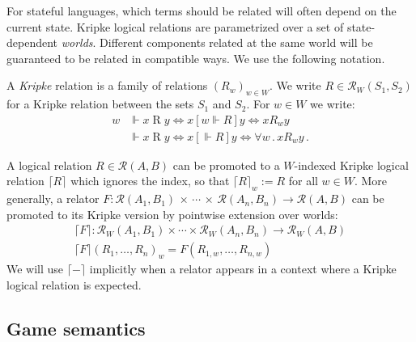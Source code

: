 \documentclass[sigplan,10pt,review,anonymous]{acmart}\settopmatter{printfolios=true,printccs=false,printacmref=false}
\newcommand{\ifr}[1]{\mathrel{[{#1}]}}
\begin{document}

For stateful languages,
which terms should be related
will often depend on the current state.
Kripke logical relations
are parametrized over a set of state-dependent \emph{worlds}.
Different components related at the same world
will be guaranteed to be related in compatible ways.
We use the following notation.

\begin{definition} \label{def:klr} %
A \emph{Kripke} relation is
a family of relations $(R_w)_{w \in W}$.
We write $R \in \mathcal{R}_W(S_1, S_2)$
for a Kripke relation between the sets $S_1$ and $S_2$.
For $w \in W$ we write:
\begin{align*}
    w &\Vdash x \mathrel{R} y \Leftrightarrow
      x \ifr{w \Vdash R} y \Leftrightarrow
      x \mathrel{R_w} y \\
    &\Vdash x \mathrel{R} y \Leftrightarrow
      x \ifr{\Vdash R} y \Leftrightarrow
      \forall w \,.\, x \mathrel{R_w} y \,.
\end{align*}
\end{definition}

A logical relation $R \in \mathcal{R}(A, B)$
can be promoted to a $W$-indexed Kripke logical relation $\lceil R \rceil$
which ignores the index, so that $\lceil R \rceil_w := R$ for all $w \in W$.
More generally,
a relator
  $F : \mathcal{R}(A_1, B_1) \,\times\,\cdots\,\times\,\mathcal{R}(A_n, B_n) \rightarrow \mathcal{R}(A, B)$
can be promoted to its Kripke version
by pointwise extension over worlds:
\begin{gather*}
  \lceil F \rceil : \mathcal{R}_W(A_1, B_1) \times \cdots \times \mathcal{R}_W(A_n, B_n) \rightarrow \mathcal{R}_W(A, B) \\
  \lceil F \rceil (R_1, \ldots, R_n)_w = F(R_{1,w}, \ldots, R_{n,w})
\end{gather*}
We will use $\lceil - \rceil$ implicitly
when a relator appears in a context where
a Kripke logical relation is expected.


\subsection{Game semantics} \label{sec:gamesem} %

\end{document}

